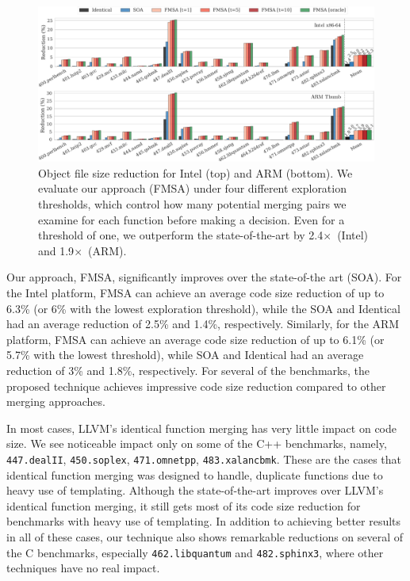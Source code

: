 \begin{figure}[h]
  \centering
  \includegraphics[width=\linewidth]{src/merging-optimisation/figs/code-size-reduction-spec.pdf}
	\caption{Object file size reduction for Intel (top) and ARM (bottom). We evaluate our approach (FMSA) under four different exploration thresholds, which
      control how many potential merging pairs we examine for each function before making a decision. Even for a threshold of one, we outperform the state-of-the-art
	  by 2.4$\times$~(Intel) and 1.9$\times$~(ARM).}
  \label{fig:reduction-obj}
\end{figure}

Our approach, FMSA, significantly improves over the state-of-the art (SOA). For the Intel platform, FMSA can achieve an average code size
reduction of up to 6.3\% (or 6\% with the lowest exploration threshold), while the SOA and Identical had an average reduction of 2.5\% and 1.4\%,
respectively. Similarly, for the ARM platform, FMSA can achieve an average code size reduction of up to 6.1\% (or 5.7\% with the lowest
threshold), while SOA and Identical had an average reduction of 3\% and 1.8\%, respectively. For several of the benchmarks, the
proposed technique achieves impressive code size reduction compared to other merging approaches.


In most cases, LLVM's identical function merging has very little impact on code
size.
We see noticeable impact only on some of the C++ benchmarks, namely,
\texttt{447.dealII}, \texttt{450.soplex}, \texttt{471.omnetpp}, \texttt{483.xalancbmk}.
These are the cases that identical function merging was designed to handle,
duplicate functions due to heavy use of templating.
Although the state-of-the-art improves over LLVM's identical function merging,
it still gets most of its code size reduction for benchmarks with heavy use of templating.
In addition to achieving better results in all of these cases, our technique
also shows remarkable reductions on several of the
C benchmarks, especially \texttt{462.libquantum} and \texttt{482.sphinx3}, where
other techniques have no real impact.


